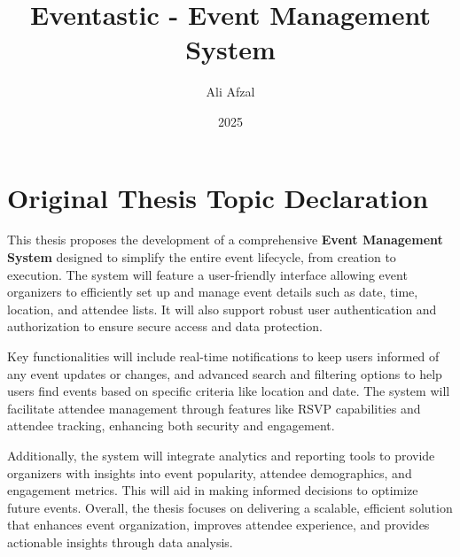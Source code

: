 \documentclass[
]{elteikthesis}[2024/10/26]
\title{Eventastic - Event Management System} %
\date{2025} %
\author{Ali Afzal}
\affiliation{Lecturer} %
\begin{document}


\maketitle
%

\chapter*{Original Thesis Topic Declaration}


\begin{center}
   {\small
This thesis proposes the development of a comprehensive \textbf{Event Management System} designed to simplify the entire event lifecycle, from creation to execution. The system will feature a user-friendly interface allowing event organizers to efficiently set up and manage event details such as date, time, location, and attendee lists. It will also support robust user authentication and authorization to ensure secure access and data protection.

Key functionalities will include real-time notifications to keep users informed of any event updates or changes, and advanced search and filtering options to help users find events based on specific criteria like location and date. The system will facilitate attendee management through features like RSVP capabilities and attendee tracking, enhancing both security and engagement.

Additionally, the system will integrate analytics and reporting tools to provide organizers with insights into event popularity, attendee demographics, and engagement metrics. This will aid in making informed decisions to optimize future events. Overall, the thesis focuses on delivering a scalable, efficient solution that enhances event organization, improves attendee experience, and provides actionable insights through data analysis.

\vspace{0.5em} %

}
\end{center}
\end{document}
